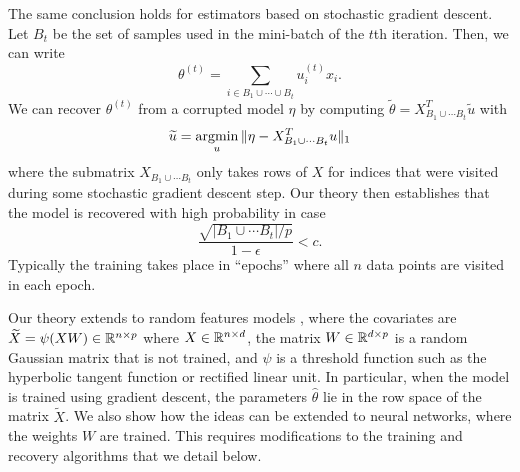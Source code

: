 The same conclusion holds for estimators based on stochastic gradient descent. Let $B_t$ be the set of samples used in the mini-batch of the $t$th iteration. Then, we can write
\begin{equation}
  \theta^{(t)} = \sum_{i\in B_1\cup\cdots\cup B_t} u_i^{(t)} x_i.
\end{equation}
We can recover $\theta^{(t)}$ from a corrupted model $\eta$ by computing $\tilde \theta = X^T_{B_1\cup \cdots B_t} \tilde u$ with
\begin{equation}
  \tilde u = \argmin_u \| \eta - X^T_{B_1\cup \cdots B_t} u\|_1
\end{equation}
where the submatrix $X_{B_1\cup\cdots B_t}$ only takes rows of $X$ for indices that were visited during some stochastic
gradient descent step. Our theory then establishes that the model is recovered with high probability in case
\begin{equation}
  \frac{\sqrt{{|B_1 \cup \cdots B_t|}/{p}}}{1-\epsilon} < c.
\end{equation}
Typically the training takes place in ``epochs'' where all $n$ data points are visited in each epoch.

 Our theory extends to random features models \citep{rahimi2008}, where the covariates are $\widetilde X = \psi(X W)\in \mathbb{R}^{n\times p}$ where $X\in\mathbb{R}^{n\times d}$, the matrix $W\in\mathbb{R}^{d\times p}$ is a random Gaussian matrix that is not trained, and $\psi$ is a threshold function such as the hyperbolic tangent function or rectified linear unit. In particular, when the model is trained using gradient descent, the parameters $\hat\theta$ lie in the row
space of the matrix $\tilde X$. We also show how the ideas can be extended to neural networks, where the weights $W$ are trained. This requires modifications to the training and recovery algorithms that we detail below.


